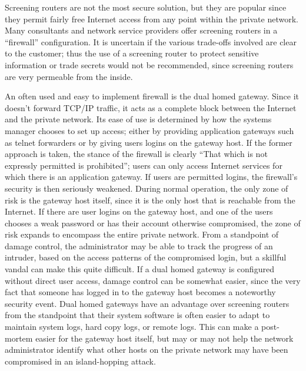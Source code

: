 \begin{htmllist}
    Screening routers are not the most secure solution, but they are
    popular since they permit fairly free Internet access from any point
    within the private network. Many consultants and network service
    providers offer screening routers in a ``firewall'' configuration. It
    is uncertain if the various trade-offs involved are clear to the
    customer; thus the use of a screening router to protect sensitive
    information or trade secrets would not be recommended, since screening
    routers are very permeable from the inside.


    \label{dual_hom}
    
    An often used and easy to implement firewall is the dual homed gateway.
    Since it doesn't forward TCP/IP traffic, it acts as a complete block
    between the Internet and the private network. Its ease of use is
    determined by how the systems manager chooses to set up access; either
    by providing application gateways such as telnet forwarders or by
    giving users logins on the gateway host. If the former approach is
    taken, the stance of the firewall is clearly ``That which is not
    expressly permitted is prohibited''; users can only access Internet
    services for which there is an application gateway. If users are
    permitted logins, the firewall's security is then seriously weakened.
    During normal operation, the only zone of risk is the gateway host
    itself, since it is the only host that is reachable from the Internet.
    If there are user logins on the gateway host, and one of the users
    chooses a weak password or has their account otherwise compromised, the
    zone of risk expands to encompass the entire private network. From a
    standpoint of damage control, the administrator may be able to track
    the progress of an intruder, based on the access patterns of the
    compromised login, but a skillful vandal can make this quite difficult.
    If a dual homed gateway is configured without direct user access,
    damage control can be somewhat easier, since the very fact that someone
    has logged in to the gateway host becomes a noteworthy security event.
    Dual homed gateways have an advantage over screening routers from the
    standpoint that their system software is often easier to adapt to
    maintain system logs, hard copy logs, or remote logs. This can make a
    post-mortem easier for the gateway host itself, but may or may not help
    the network administrator identify what other hosts on the private
    network may have been compromised in an island-hopping attack.\\
    

\end{htmllist}

